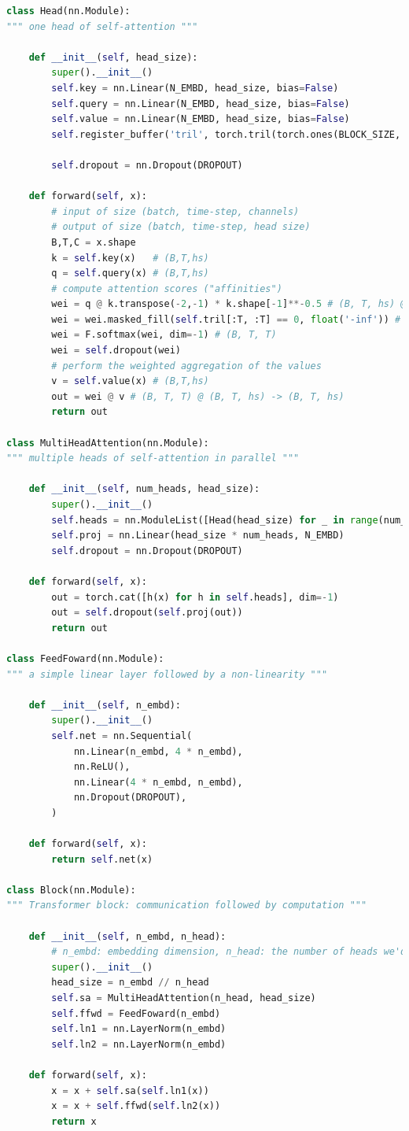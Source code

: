 \begin{lstlisting}[language=Python]
class Head(nn.Module):
""" one head of self-attention """

    def __init__(self, head_size):
        super().__init__()
        self.key = nn.Linear(N_EMBD, head_size, bias=False)
        self.query = nn.Linear(N_EMBD, head_size, bias=False)
        self.value = nn.Linear(N_EMBD, head_size, bias=False)
        self.register_buffer('tril', torch.tril(torch.ones(BLOCK_SIZE, BLOCK_SIZE)))

        self.dropout = nn.Dropout(DROPOUT)

    def forward(self, x):
        # input of size (batch, time-step, channels)
        # output of size (batch, time-step, head size)
        B,T,C = x.shape
        k = self.key(x)   # (B,T,hs)
        q = self.query(x) # (B,T,hs)
        # compute attention scores ("affinities")
        wei = q @ k.transpose(-2,-1) * k.shape[-1]**-0.5 # (B, T, hs) @ (B, hs, T) -> (B, T, T)
        wei = wei.masked_fill(self.tril[:T, :T] == 0, float('-inf')) # (B, T, T)
        wei = F.softmax(wei, dim=-1) # (B, T, T)
        wei = self.dropout(wei)
        # perform the weighted aggregation of the values
        v = self.value(x) # (B,T,hs)
        out = wei @ v # (B, T, T) @ (B, T, hs) -> (B, T, hs)
        return out

class MultiHeadAttention(nn.Module):
""" multiple heads of self-attention in parallel """

    def __init__(self, num_heads, head_size):
        super().__init__()
        self.heads = nn.ModuleList([Head(head_size) for _ in range(num_heads)])
        self.proj = nn.Linear(head_size * num_heads, N_EMBD)
        self.dropout = nn.Dropout(DROPOUT)

    def forward(self, x):
        out = torch.cat([h(x) for h in self.heads], dim=-1)
        out = self.dropout(self.proj(out))
        return out

class FeedFoward(nn.Module):
""" a simple linear layer followed by a non-linearity """

    def __init__(self, n_embd):
        super().__init__()
        self.net = nn.Sequential(
            nn.Linear(n_embd, 4 * n_embd),
            nn.ReLU(),
            nn.Linear(4 * n_embd, n_embd),
            nn.Dropout(DROPOUT),
        )

    def forward(self, x):
        return self.net(x)

class Block(nn.Module):
""" Transformer block: communication followed by computation """

    def __init__(self, n_embd, n_head):
        # n_embd: embedding dimension, n_head: the number of heads we'd like
        super().__init__()
        head_size = n_embd // n_head
        self.sa = MultiHeadAttention(n_head, head_size)
        self.ffwd = FeedFoward(n_embd)
        self.ln1 = nn.LayerNorm(n_embd)
        self.ln2 = nn.LayerNorm(n_embd)

    def forward(self, x):
        x = x + self.sa(self.ln1(x))
        x = x + self.ffwd(self.ln2(x))
        return x
\end{lstlisting}

